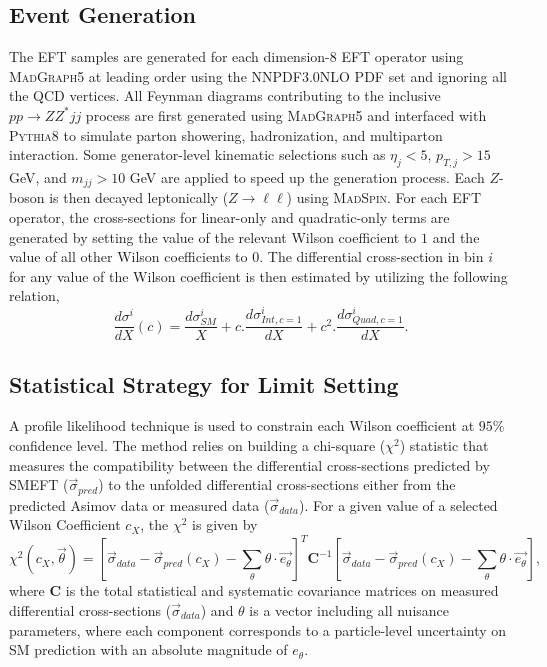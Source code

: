 \subsection{Event Generation}
\label{subsec:EFT_EventGen}
The EFT samples are generated for each dimension-8 EFT operator using \textsc{MadGraph5} at leading order using the NNPDF3.0NLO PDF set and ignoring all the QCD vertices.
All Feynman diagrams contributing to the inclusive $pp \rightarrow ZZ^* jj$ process are first generated using \textsc{MadGraph5} and interfaced with \textsc{Pythia8} to simulate parton showering, hadronization, and multiparton interaction. Some generator-level kinematic selections such as $\eta_{j}<5$, $p_{T,j} > 15$ GeV, and $m_{jj} > 10$ GeV are applied to speed up the generation process. Each $Z$-boson is then decayed leptonically ($Z\rightarrow \ell \ell$) using \textsc{MadSpin}. For each EFT operator, the cross-sections for linear-only and quadratic-only terms are generated by setting the value of the relevant Wilson coefficient to $1$ and the value of all other Wilson coefficients to $0$. The differential cross-section in bin $i$ for any value of the Wilson coefficient is then estimated by utilizing the following relation,
\begin{equation}
\frac{d\sigma ^{i}}{dX}(c) = \frac{d\sigma ^{i}_{SM}}{X} + c . \frac{d\sigma ^{i}_{Int, c=1}}{dX} + c^2 . \frac{d\sigma ^{i}_{Quad, c=1}}{dX}.
\label{eqn:DiffxS_EFT}
\end{equation}

\subsection{Statistical Strategy for Limit Setting}
\label{subsec:EFT_Method}
A profile likelihood technique \cite{ProfileLikelihood} is used to constrain each Wilson coefficient at $95\%$ confidence level. The method relies on building a chi-square ($\chi^2$) statistic that measures the compatibility between the differential cross-sections predicted by SMEFT ($\vec{\sigma}_{pred}$) to the unfolded differential cross-sections either from the predicted Asimov data or measured data ($\vec{\sigma}_{data}$). For a given value of a selected Wilson Coefficient $c_X$, the $\chi^2$ is given by
\begin{equation}
    \chi^2(c_X, \vec{\theta}) = [\vec{\sigma}_{data} - \vec{\sigma}_{pred}(c_X)- \sum_{\theta}\theta\cdot\vec{e_\theta} ]^T \textbf{C}^{-1}[\vec{\sigma}_{data}  - \vec{\sigma}_{pred}(c_X) - \sum_{\theta}\theta\cdot\vec{e_\theta}],
    \label{eq:eftchi2}
\end{equation} 
where $\textbf{C}$ is the total statistical and systematic covariance matrices on measured differential cross-sections ($\vec{\sigma}_{data}$) and $\theta$ is a vector including all nuisance parameters, where each component corresponds to a particle-level uncertainty on SM prediction with an absolute magnitude of $e_{\theta}$.

